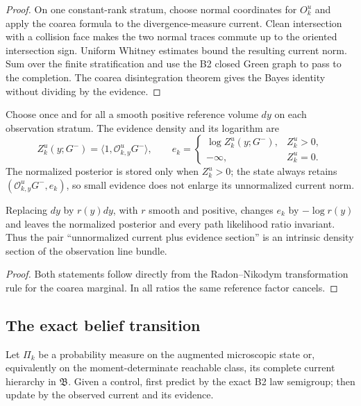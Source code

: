 \begin{proof}
On one constant-rank stratum, choose normal coordinates for $O_k^u$ and apply
the coarea formula to the divergence-measure current.  Clean intersection with
a collision face makes the two normal traces commute up to the oriented
intersection sign.  Uniform Whitney estimates bound the resulting current
norm.  Sum over the finite stratification and use the B2 closed Green graph to
pass to the completion.  The coarea disintegration theorem gives the Bayes
identity without dividing by the evidence.
\end{proof}

Choose once and for all a smooth positive reference volume $dy$ on each
observation stratum.  The evidence density and its logarithm are
\[
 Z_k^u(y;G^-)=\langle1,\mathcal O_{k,y}^uG^-\rangle,
 \qquad e_k=\begin{cases}\log Z_k^u(y;G^-),&Z_k^u>0,\\-\infty,&Z_k^u=0.
 \end{cases}
\]
The normalized posterior is stored only when $Z_k^u>0$; the state always
retains $(\mathcal O_{k,y}^uG^-,e_k)$, so small evidence does not enlarge its
unnormalized current norm.

\begin{lemma}
\label{lem:r9-c1-evidence}
Replacing $dy$ by $r(y)dy$, with $r$ smooth and positive, changes
$e_k$ by $-\log r(y)$ and leaves the normalized posterior and every path
likelihood ratio invariant.  Thus the pair ``unnormalized current plus evidence
section'' is an intrinsic density section of the observation line bundle.
\end{lemma}

\begin{proof}
Both statements follow directly from the Radon--Nikodym transformation rule
for the coarea marginal.  In all ratios the same reference factor cancels.
\end{proof}

\subsection{The exact belief transition}

Let $\Pi_k$ be a probability measure on the augmented microscopic state or,
equivalently on the moment-determinate reachable class, its complete current
hierarchy in $\mathfrak B$.  Given a control, first predict by the exact B2 law
semigroup; then update by the observed current and its evidence.

